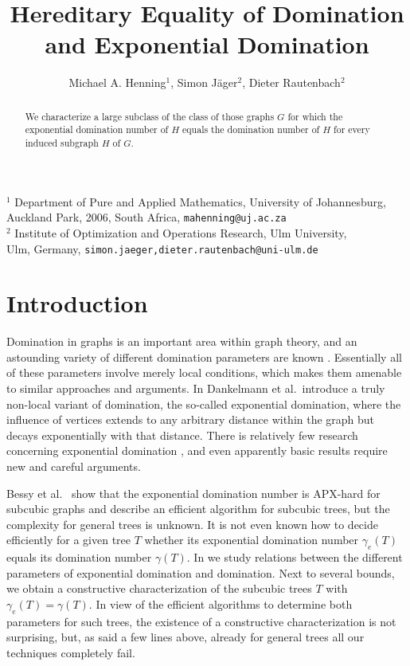 \documentclass[12pt]{article}
\begin{document}
\title{Hereditary Equality of Domination\\ and Exponential Domination}
\author{Michael A. Henning$^1$, Simon J\"{a}ger$^2$, Dieter Rautenbach$^2$}
\date{}
\maketitle
\vspace{-10mm}
\begin{center}
{\small
$^1$ Department of Pure and Applied Mathematics, University of Johannesburg,\\
Auckland Park, 2006, South Africa, \texttt{mahenning@uj.ac.za}\\[3mm]
$^2$
Institute of Optimization and Operations Research, Ulm University,\\
Ulm, Germany, \texttt{simon.jaeger,dieter.rautenbach@uni-ulm.de}}
\end{center}

\begin{abstract}
We characterize a large subclass of the class of those graphs $G$
for which the exponential domination number of $H$ equals the domination number of $H$ for every induced subgraph $H$ of $G$.
\end{abstract}

\section{Introduction}

Domination in graphs is an important area within graph theory,
and an astounding variety of different domination parameters are known \cite{hhs}. 
Essentially all of these parameters involve merely local conditions, 
which makes them amenable to similar approaches and arguments.
In \cite{ddems} Dankelmann et al.~introduce a truly non-local variant of domination, the so-called exponential domination, 
where the influence of vertices extends to any arbitrary distance within the graph but decays exponentially with that distance.
There is relatively few research concerning exponential domination \cite{abcvy,aa,bor1,bor2}, and even apparently basic results require new and careful arguments.

Bessy et al.~\cite{bor2} show that the exponential domination number is APX-hard for subcubic graphs and describe an efficient algorithm for subcubic trees, but the complexity for general trees is unknown.
It is not even known how to decide efficiently 
for a given tree $T$
whether its exponential domination number $\gamma_e(T)$
equals its domination number $\gamma(T)$.
In \cite{hjr} we study relations between the different parameters of exponential domination and domination. Next to several bounds, we obtain a constructive characterization of the subcubic trees $T$ with $\gamma_e(T)=\gamma(T)$.
In view of the efficient algorithms to determine both parameters for such trees, the existence of a constructive characterization is not surprising, but, as said a few lines above, already for general trees all our techniques completely fail.
\end{document}
